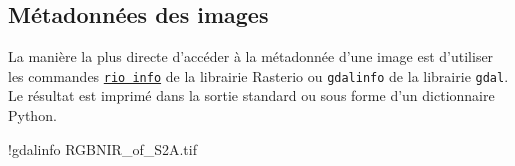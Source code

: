 \documentclass[
  11pt,
  letterpaper,
  open=any,
  twoside=false,
  french]{scrbook}
\newenvironment{Shaded}{\begin{snugshade}}{\end{snugshade}}
\newcommand{\NormalTok}[1]{\textcolor[rgb]{0.00,0.23,0.31}{#1}}
\newcommand{\OperatorTok}[1]{\textcolor[rgb]{0.37,0.37,0.37}{#1}}
\begin{document}
\subsection{Métadonnées des images}\label{muxe9tadonnuxe9es-des-images}

La manière la plus directe d'accéder à la métadonnée d'une image est
d'utiliser les commandes
\href{https://rasterio.readthedocs.io/en/stable/cli.html\#info}{\texttt{rio\ info}}
de la librairie Rasterio ou \texttt{gdalinfo} de la librairie
\texttt{gdal}. Le résultat est imprimé dans la sortie standard ou sous
forme d'un dictionnaire Python.

\begin{Shaded}
\begin{Highlighting}[]
\OperatorTok{!}\NormalTok{gdalinfo RGBNIR\_of\_S2A.tif}
\end{Highlighting}
\end{Shaded}
\end{document}
